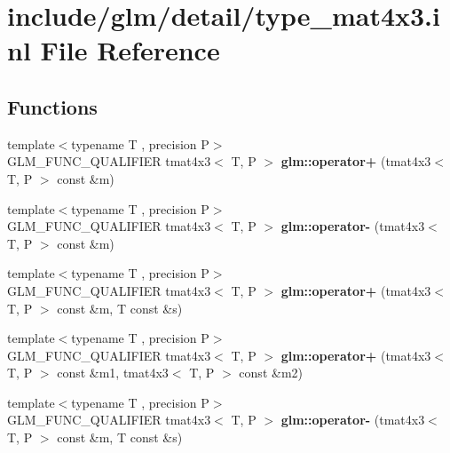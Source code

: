 \hypertarget{type__mat4x3_8inl}{}\section{include/glm/detail/type\+\_\+mat4x3.inl File Reference}
\label{type__mat4x3_8inl}
\subsection*{Functions}
\begin{DoxyCompactItemize}
\item 
\mbox{\label{type__mat4x3_8inl_a60835fb1a69331ebbee568669fc918a0}} 
{\footnotesize template$<$typename T , precision P$>$ }\\G\+L\+M\+\_\+\+F\+U\+N\+C\+\_\+\+Q\+U\+A\+L\+I\+F\+I\+ER tmat4x3$<$ T, P $>$ {\bfseries glm\+::operator+} (tmat4x3$<$ T, P $>$ const \&m)
\item 
\mbox{\label{type__mat4x3_8inl_a60d99cdce91f523e466b9c6fec36a763}} 
{\footnotesize template$<$typename T , precision P$>$ }\\G\+L\+M\+\_\+\+F\+U\+N\+C\+\_\+\+Q\+U\+A\+L\+I\+F\+I\+ER tmat4x3$<$ T, P $>$ {\bfseries glm\+::operator-\/} (tmat4x3$<$ T, P $>$ const \&m)
\item 
\mbox{\label{type__mat4x3_8inl_a876e75ebc71288bb2eef6eb29918f14a}} 
{\footnotesize template$<$typename T , precision P$>$ }\\G\+L\+M\+\_\+\+F\+U\+N\+C\+\_\+\+Q\+U\+A\+L\+I\+F\+I\+ER tmat4x3$<$ T, P $>$ {\bfseries glm\+::operator+} (tmat4x3$<$ T, P $>$ const \&m, T const \&s)
\item 
\mbox{\label{type__mat4x3_8inl_ac3869c4747532b81543c0bf725251546}} 
{\footnotesize template$<$typename T , precision P$>$ }\\G\+L\+M\+\_\+\+F\+U\+N\+C\+\_\+\+Q\+U\+A\+L\+I\+F\+I\+ER tmat4x3$<$ T, P $>$ {\bfseries glm\+::operator+} (tmat4x3$<$ T, P $>$ const \&m1, tmat4x3$<$ T, P $>$ const \&m2)
\item 
\mbox{\label{type__mat4x3_8inl_afcb0d386fe4230e7be47ef8bc7eac70b}} 
{\footnotesize template$<$typename T , precision P$>$ }\\G\+L\+M\+\_\+\+F\+U\+N\+C\+\_\+\+Q\+U\+A\+L\+I\+F\+I\+ER tmat4x3$<$ T, P $>$ {\bfseries glm\+::operator-\/} (tmat4x3$<$ T, P $>$ const \&m, T const \&s)

\end{DoxyCompactItemize}
